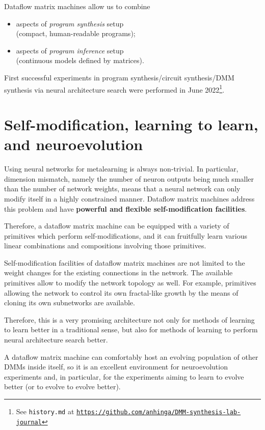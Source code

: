 \documentclass{article}
\begin{document}
\vspace{0.1in}
\noindent
Dataflow matrix machines allow us  to combine

  \begin{itemize}
      \item aspects of {\em program synthesis} setup\\ (compact, human-readable programs);
      \item aspects of {\em program inference} setup\\ (continuous models defined by matrices).
  \end{itemize}

First successful experiments in program synthesis/circuit synthesis/DMM synthesis via neural architecture search
were performed in June 2022\footnote{See {\tt history.md} at
\href{https://github.com/anhinga/DMM-synthesis-lab-journal}{\tt https://github.com/anhinga/DMM-synthesis-lab-journal}}.

\section{Self-modification, learning to learn, and neuroevolution} \label{sec:selfref}

Using neural networks for metalearning
is always non-trivial. In particular, dimension mismatch, namely the number of neuron outputs 
being much smaller than the number of network weights,
means that a neural network
can only modify itself in a highly constrained manner. Dataflow matrix machines address
this problem and have {\bf powerful and flexible self-modification facilities}.

Therefore, a dataflow matrix machine can be equipped with a variety of primitives
which perform self-modifications, and it can fruitfully learn various linear combinations and
compositions involving those primitives.

Self-modification facilities of dataflow matrix machines are not limited to the weight
changes for the existing connections in the network. The available primitives allow to
modify the network topology as well. For example, primitives allowing the network
to control its own fractal-like growth by the means of cloning its own subnetworks
are available.

Therefore, this is a very promising architecture not only for methods of learning to learn
better in a traditional sense, but also for methods of learning to perform
neural architecture search better. 

A dataflow matrix machine can comfortably host
an evolving population of other DMMs inside itself, so it is
an excellent environment for neuroevolution experiments and, in particular,
for the experiments aiming to learn to evolve better (or to evolve to evolve better).
\end{document}
